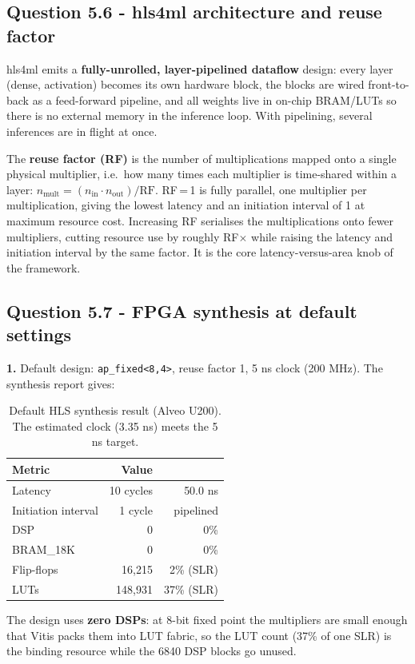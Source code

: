 \documentclass[11pt,a4paper]{article}
\newcommand{\Q}[1]{\subsection*{Question #1}}
\newcommand{\Qpart}[1]{\textbf{#1.}}
\begin{document}
\Q{5.6 - hls4ml architecture and reuse factor}

hls4ml emits a \textbf{fully-unrolled, layer-pipelined dataflow} design: every layer (dense, activation) becomes its own hardware block, the blocks are wired front-to-back as a feed-forward pipeline, and all weights live in on-chip BRAM/LUTs so there is no external memory in the inference loop. With pipelining, several inferences are in flight at once.

The \textbf{reuse factor (RF)} is the number of multiplications mapped onto a single physical multiplier, i.e.\ how many times each multiplier is time-shared within a layer: $n_{\text{mult}} = (n_{\text{in}}\cdot n_{\text{out}})/\text{RF}$. RF\,=\,1 is fully parallel, one multiplier per multiplication, giving the lowest latency and an initiation interval of 1 at maximum resource cost. Increasing RF serialises the multiplications onto fewer multipliers, cutting resource use by roughly RF$\times$ while raising the latency and initiation interval by the same factor. It is the core latency-versus-area knob of the framework.

\Q{5.7 - FPGA synthesis at default settings}

\Qpart{1} Default design: \texttt{ap\_fixed<8,4>}, reuse factor 1, 5 ns clock (200 MHz). The synthesis report gives:

\begin{table}[h]
\centering
\small
\begin{tabular}{lrr}
\toprule
Metric & Value & \\
\midrule
Latency & 10 cycles & 50.0 ns \\
Initiation interval & 1 cycle & pipelined \\
\midrule
DSP & 0 & 0\% \\
BRAM\_18K & 0 & 0\% \\
Flip-flops & 16{,}215 & 2\% (SLR) \\
LUTs & 148{,}931 & 37\% (SLR) \\
\bottomrule
\end{tabular}
\caption{Default HLS synthesis result (Alveo U200). The estimated clock (3.35 ns) meets the 5 ns target.}
\label{tab:fpga_default}
\end{table}

The design uses \textbf{zero DSPs}: at 8-bit fixed point the multipliers are small enough that Vitis packs them into LUT fabric, so the LUT count (37\% of one SLR) is the binding resource while the 6840 DSP blocks go unused.
\end{document}
